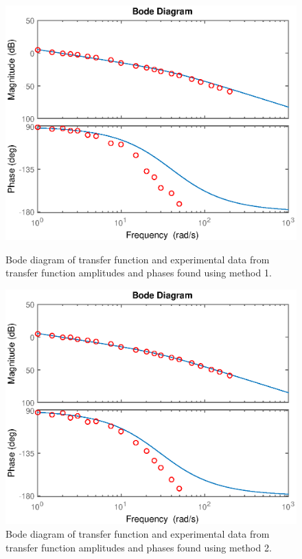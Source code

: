 \documentclass{article}
\begin{document}
\begin{figure}[H]
	\hspace{0.5cm}
	\begin{minipage}{7cm}
		\centering
		\includegraphics[scale=0.5]{fig2}
		\caption{Bode diagram of transfer function and experimental data from transfer function amplitudes and phases found using method 1.}
	\end{minipage}
	\hspace{1cm}
	\begin{minipage}{7cm}
		\centering
		\includegraphics[scale=0.5]{fig4}
		\caption{Bode diagram of transfer function and experimental data from transfer function amplitudes and phases found using method 2.}
	\end{minipage}	
\end{figure} 
\newpage
\end{document}
